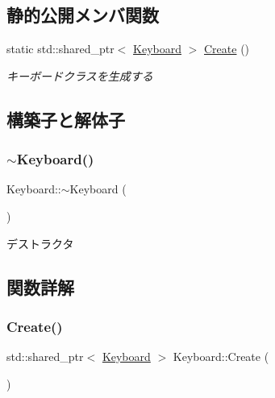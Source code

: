 \subsection*{静的公開メンバ関数}
\begin{DoxyCompactItemize}
\item 
static std\+::shared\+\_\+ptr$<$ \mbox{\hyperlink{class_keyboard}{Keyboard}} $>$ \mbox{\hyperlink{class_keyboard_a7bb0cd030164213f2a858522aad4d7e6}{Create}} ()
\begin{DoxyCompactList}\small\item\em キーボードクラスを生成する \end{DoxyCompactList}\end{DoxyCompactItemize}


\subsection{構築子と解体子}
\mbox{\label{class_keyboard_af6a99ec66c8c722a45b967bf79167038}} 
\subsubsection{\texorpdfstring{$\sim$\+Keyboard()}{~Keyboard()}}
{\footnotesize\ttfamily Keyboard\+::$\sim$\+Keyboard (\begin{DoxyParamCaption}{ }\end{DoxyParamCaption})}



デストラクタ 



\subsection{関数詳解}
\mbox{\label{class_keyboard_a7bb0cd030164213f2a858522aad4d7e6}} 
\subsubsection{\texorpdfstring{Create()}{Create()}}
{\footnotesize\ttfamily std\+::shared\+\_\+ptr$<$ \mbox{\hyperlink{class_keyboard}{Keyboard}} $>$ Keyboard\+::\+Create (\begin{DoxyParamCaption}{ }\end{DoxyParamCaption})\hspace{0.3cm}{\ttfamily [static]}}




